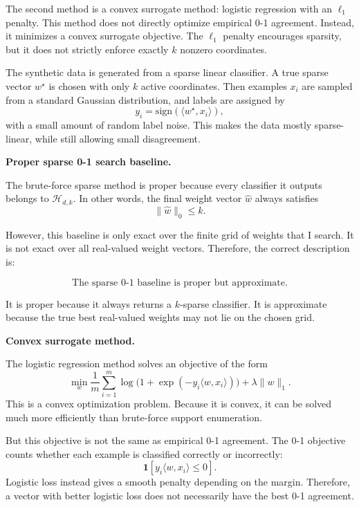 \documentclass[11pt]{article}
\newcommand{\sign}{\mathrm{sign}}
\begin{document}
\begin{enumerate}
\begin{solutionbox}
        The second method is a convex surrogate method: logistic regression with an $\ell_1$
        penalty. This method does not directly optimize empirical 0-1 agreement. Instead, it
        minimizes a convex surrogate objective. The $\ell_1$ penalty encourages sparsity, but it
        does not strictly enforce exactly $k$ nonzero coordinates.

        The synthetic data is generated from a sparse linear classifier. A true sparse vector
        $w^\star$ is chosen with only $k$ active coordinates. Then examples $x_i$ are sampled
        from a standard Gaussian distribution, and labels are assigned by
        \[
        y_i=\sign(\langle w^\star,x_i\rangle),
        \]
        with a small amount of random label noise. This makes the data mostly sparse-linear,
        while still allowing small disagreement.

        \medskip

        \textbf{Proper sparse 0-1 search baseline.}

        The brute-force sparse method is proper because every classifier it outputs belongs to
        $\mathcal{H}_{d,k}$. In other words, the final weight vector $\widehat w$ always satisfies
        \[
        \|\widehat w\|_0\le k.
        \]

        However, this baseline is only exact over the finite grid of weights that I search. It is
        not exact over all real-valued weight vectors. Therefore, the correct description is:

        \[
        \boxed{
        \text{The sparse 0-1 baseline is proper but approximate.}
        }
        \]

        It is proper because it always returns a $k$-sparse classifier. It is approximate because
        the true best real-valued weights may not lie on the chosen grid.

        \medskip

        \textbf{Convex surrogate method.}

        The logistic regression method solves an objective of the form
        \[
        \min_w
        \frac{1}{m}\sum_{i=1}^m
        \log\bigl(1+\exp(-y_i\langle w,x_i\rangle)\bigr)
        +
        \lambda\|w\|_1.
        \]
        This is a convex optimization problem. Because it is convex, it can be solved much more
        efficiently than brute-force support enumeration.

        But this objective is not the same as empirical 0-1 agreement. The 0-1 objective counts
        whether each example is classified correctly or incorrectly:
        \[
        \mathbf{1}[y_i\langle w,x_i\rangle\le 0].
        \]
        Logistic loss instead gives a smooth penalty depending on the margin. Therefore, a vector
        with better logistic loss does not necessarily have the best 0-1 agreement.


\end{solutionbox}
\end{enumerate}
\end{document}
